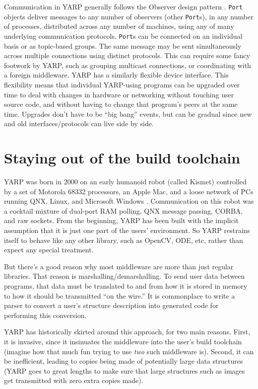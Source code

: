 \documentclass[letterpaper]{article}
\begin{document}
Communication in YARP generally follows the Observer design pattern
\cite{gamma95design}. {\tt Port} objects deliver messages to any
number of observers (other {\tt Port}s), in any number of processes,
distributed across any number of machines, using any of many
underlying communication protocols.  {\tt Port}s can be connected on
an individual basis or as topic-based groups.  The same message may be
sent simultaneously across multiple connections using distinct
protocols.  This can require some fancy footwork by YARP, such as
grouping multicast connections, or coordinating with a foreign
middleware.  YARP has a similarly flexible device interface.  This
flexibility means that individual YARP-using programs can be upgraded
over time to deal with changes in hardware or networking without
touching user source code, and without having to change that program's
peers at the same time.  Upgrades don't have to be ``big bang''
events, but can be gradual since new and old interfaces/protocols can
live side by side.

\section{Staying out of the build toolchain}

YARP was born in 2000 on an early humanoid robot (called Kismet)
controlled by a set of Motorola 68332 processors, an Apple Mac, and a
loose network of PCs running QNX, Linux, and Microsoft Windows
\cite{metta06yarp}.  Communication on this robot was a cocktail
mixture of dual-port RAM polling, QNX message passing, CORBA, and raw
sockets.  From the beginning, YARP has been built with the implicit
assumption that it is just one part of the users' environment.  So
YARP restrains itself to behave like any other library, such as
OpenCV, ODE, etc, rather than expect any special treatment.

But there's a good reason why most middleware are more than just
regular libraries.  That reason is marshalling/demarshalling.  To send
user data between programs, that data must be translated to and from
how it is stored in memory to how it should be transmitted ``on the
wire.''  It is commonplace to write a parser to convert a user's
structure description into generated code for performing this
conversion.

YARP has historically skirted around this approach, for two main
reasons.  First, it is invasive, since it insinuates the middleware
into the user's build toolchain (imagine how that much fun trying to
use {\it two} such middleware is).  Second, it can be inefficient,
leading to copies being made of potentially large data structures
(YARP goes to great lengths to make sure that large structures such
as images get transmitted with zero extra copies made).
\end{document}
